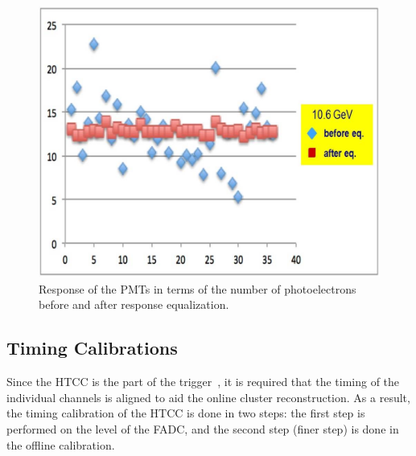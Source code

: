 %

\begin{figure}[ht]
\centering
\includegraphics[width=0.99\linewidth]{images/NICK_svodni.jpg}
\caption{Response of the PMTs in terms of the number of photoelectrons before and after response equalization.}
\label{fig:NICK_svodni}
\end{figure}

\subsection{Timing Calibrations}

Since the HTCC is the part of the trigger~\cite{trigger-nim}, it is required that the timing of the individual
channels is aligned to aid the online cluster reconstruction. As a result, the timing calibration of the HTCC is done
in two steps: the first step is performed on the level of the FADC, and the second step (finer step) is done in the
offline calibration.

